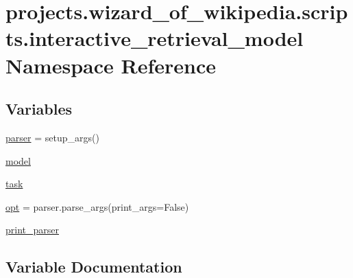 \hypertarget{namespaceprojects_1_1wizard__of__wikipedia_1_1scripts_1_1interactive__retrieval__model}{}\section{projects.\+wizard\+\_\+of\+\_\+wikipedia.\+scripts.\+interactive\+\_\+retrieval\+\_\+model Namespace Reference}
\label{namespaceprojects_1_1wizard__of__wikipedia_1_1scripts_1_1interactive__retrieval__model}
\subsection*{Variables}
\begin{DoxyCompactItemize}
\item 
\hyperlink{namespaceprojects_1_1wizard__of__wikipedia_1_1scripts_1_1interactive__retrieval__model_af0ec369ed828df31d66ae8f6a6cc017e}{parser} = setup\+\_\+args()
\item 
\hyperlink{namespaceprojects_1_1wizard__of__wikipedia_1_1scripts_1_1interactive__retrieval__model_aa65c5018f3942dc1f3c0c1776d1248d5}{model}
\item 
\hyperlink{namespaceprojects_1_1wizard__of__wikipedia_1_1scripts_1_1interactive__retrieval__model_af71f14598479c047dc908c7f7f26d5db}{task}
\item 
\hyperlink{namespaceprojects_1_1wizard__of__wikipedia_1_1scripts_1_1interactive__retrieval__model_afdd7e3cf2ffbd01ae839087beec532e6}{opt} = parser.\+parse\+\_\+args(print\+\_\+args=False)
\item 
\hyperlink{namespaceprojects_1_1wizard__of__wikipedia_1_1scripts_1_1interactive__retrieval__model_a83414476fb9a6c53b0af1ce8b5c9292a}{print\+\_\+parser}
\end{DoxyCompactItemize}


\subsection{Variable Documentation}
\mbox{\label{namespaceprojects_1_1wizard__of__wikipedia_1_1scripts_1_1interactive__retrieval__model_aa65c5018f3942dc1f3c0c1776d1248d5}} 
